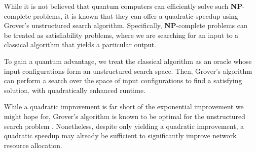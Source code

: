 While it is not believed that quantum computers can efficiently solve such \textbf{NP}-complete problems, it is known that they can offer a quadratic speedup using Grover's unstructured search algorithm. Specifically, \textbf{NP}-complete problems can be treated as satisfiability problems, where we are searching for an input to a classical algorithm that yields a particular output.

To gain a quantum advantage, we treat the classical algorithm as an oracle whose input configurations form an unstructured search space. Then, Grover's algorithm can perform a search over the space of input configurations to find a satisfying solution, with quadratically enhanced runtime.

While a quadratic improvement is far short of the exponential improvement we might hope for, Grover's algorithm is known to be optimal for the unstructured search problem \cite{?}. Nonetheless, despite only yielding a quadratic improvement, a quadratic speedup may already be sufficient to significantly improve network resource allocation.